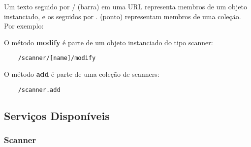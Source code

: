 Um texto seguido por / (barra) em uma URL representa membros de um objeto 
instanciado, e os seguidos por . (ponto) representam membros de uma coleção. 
Por exemplo:

O método {\bf modify} é parte de um objeto instanciado do tipo scanner:
\begin{verbatim}
    /scanner/[name]/modify
\end{verbatim}

O método {\bf add} é parte de uma coleção de scanners:
\begin{verbatim}
    /scanner.add
\end{verbatim}

\subsection{Serviços Disponíveis}
\label{sec:servicos_disponiveis}

\subsubsection{Scanner}

